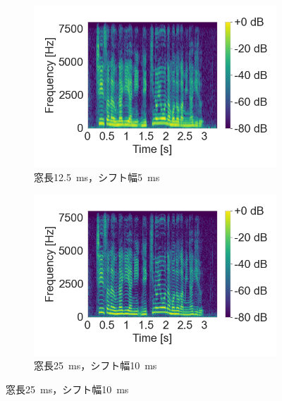 \begin{figure}[tb]
    \centering
    \begin{subfigure}[b]{0.48\textwidth}
        \centering
        \includegraphics[width=\textwidth]{./figure/sec2/spectrogram_1.png}
        \caption{窓長\SI{12.5}{\ms}，シフト幅\SI{5}{\ms}}
        \label{sec2:fig:spectrogram1}
    \end{subfigure}
    \begin{subfigure}[b]{0.48\textwidth}
        \centering
        \includegraphics[width=\textwidth]{./figure/sec2/spectrogram_2.png}
        \caption{窓長\SI{25}{\ms}，シフト幅\SI{10}{\ms}}
        \label{sec2:fig:spectrogram2}
    \end{subfigure}

    \vspace{0.5cm}


\end{figure}
